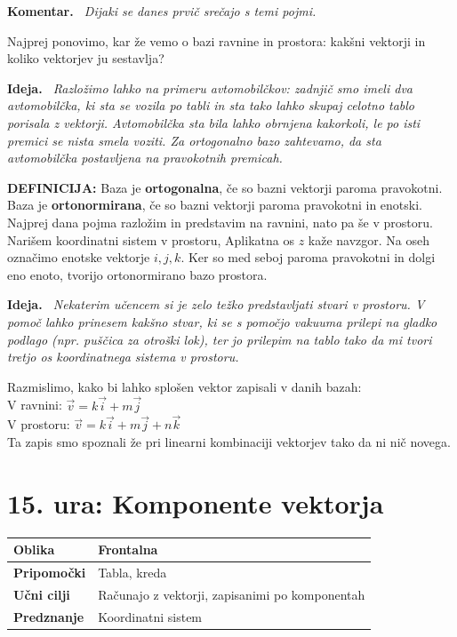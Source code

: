 \documentclass[a4paper,11pt]{article}
\newenvironment{ide}{%
  \par\medskip\noindent\textbf{Ideja.}\itshape\ }{\par\medskip}
\newenvironment{komentar}{%
  \par\medskip\noindent\textbf{Komentar.}\itshape\ }{\par\medskip}
\begin{document}
\begin{komentar}
    Dijaki se danes prvič srečajo s temi pojmi. 
\end{komentar}
Najprej ponovimo, kar že vemo o bazi ravnine in prostora: kakšni vektorji in koliko vektorjev ju sestavlja?\\
\begin{ide}
    Razložimo lahko na primeru avtomobilčkov: zadnjič smo imeli dva avtomobilčka, ki sta se vozila po tabli in sta tako lahko skupaj celotno tablo porisala z vektorji. Avtomobilčka sta bila lahko obrnjena kakorkoli, le po isti premici se nista smela voziti. Za ortogonalno bazo zahtevamo, da sta avtomobilčka postavljena na pravokotnih premicah.
\end{ide}
\textbf{DEFINICIJA:} Baza je \textbf{ortogonalna}, če so bazni vektorji paroma pravokotni.
Baza je \textbf{ortonormirana}, če so bazni vektorji paroma pravokotni in enotski.\\
Najprej dana pojma razložim in predstavim na ravnini, nato pa še v prostoru.
Narišem koordinatni sistem v prostoru, Aplikatna os $z$ kaže navzgor. Na oseh označimo enotske vektorje $i,j,k$. 
Ker so med seboj paroma pravokotni in dolgi eno enoto, tvorijo ortonormirano bazo prostora.
\begin{ide}
    Nekaterim učencem si je zelo težko predstavljati stvari v prostoru. V pomoč lahko prinesem kakšno stvar, ki se s pomočjo vakuuma prilepi na gladko podlago (npr. puščica za otroški lok), ter jo prilepim na tablo tako da mi tvori tretjo os koordinatnega sistema v prostoru. 
\end{ide}
Razmislimo, kako bi lahko splošen vektor zapisali v danih bazah: \\
V ravnini: $\vec{v}=k\vec{i}+m\vec{j}$\\
V prostoru: $\vec{v}=k\vec{i}+m\vec{j}+n\vec{k}$\\
Ta zapis smo spoznali že pri linearni kombinaciji vektorjev tako da ni nič novega.
\newpage
\section{15. ura: Komponente vektorja}
\begin{tabularx}{\textwidth}{|>{\bfseries\RaggedRight}p{2.7cm}|X|}
\hline
Oblika & Frontalna \\ \hline
Pripomočki & Tabla, kreda \\ \hline
Učni cilji & Računajo z vektorji, zapisanimi po komponentah \\ \hline
Predznanje & Koordinatni sistem \\ \hline

\end{tabularx}
\\
\end{document}
